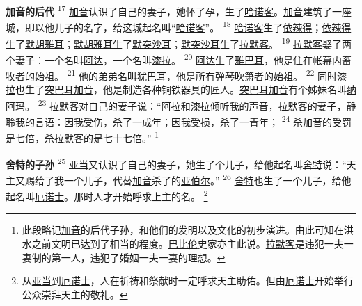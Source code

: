\textbf{加音的后代 }
\textsuperscript{17}
\uline{加音}认识了自己的妻子，她怀了孕，生了\uline{哈诺客}。\uline{加音}建筑了一座城，即以他儿子的名字，给这城起名叫“\uline{哈诺客}”。
\textsuperscript{18}
\uline{哈诺客}生了\uline{依辣得}；\uline{依辣得}生了\uline{默胡雅耳}；\uline{默胡雅耳}生了\uline{默突沙耳}；\uline{默突沙耳}生了\uline{拉默客}。
\textsuperscript{19}
\uline{拉默客}娶了两个妻子：一个名叫\uline{阿达}，一个名叫\uline{漆拉}。
\textsuperscript{20}
\uline{阿达}生了\uline{雅巴耳}，他是住在帐幕内畜牧者的始祖。
\textsuperscript{21}
他的弟弟名叫\uline{犹巴耳}，他是所有弹琴吹箫者的始祖。
\textsuperscript{22}
同时\uline{漆拉}也生了\uline{突巴耳}\uline{加音}，他是制造各种铜铁器具的匠人。\uline{突巴耳}\uline{加音}有个姊妹名叫\uline{纳阿玛}。
\textsuperscript{23}
\uline{拉默客}对自己的妻子说：“\uline{阿拉}和\uline{漆拉}倾听我的声音，\uline{拉默客}的妻子，静聆我的言语：因我受伤，杀了一成年；因我受损，杀了一青年；
\textsuperscript{24}
杀\uline{加音}的受罚是七倍，杀\uline{拉默客}的是七十七倍。”
\footnote{此段略记\uline{加音}的后代子孙，和他们的发明以及文化的初步演进。由此可知在洪水之前文明已达到了相当的程度。\uline{巴比伦}史家亦主此说。\uline{拉默客}是违犯一夫一妻制的第一人，违犯了婚姻一夫一妻的理想。}

\textbf{舍特的子孙 }
\textsuperscript{25}
\uline{亚当}又认识了自己的妻子，她生了个儿子，给他起名叫\uline{舍特}说：“天主又赐给了我一个儿子，代替\uline{加音}杀了的\uline{亚伯尔}。”
\textsuperscript{26}
\uline{舍特}也生了一个儿子，给他起名叫\uline{厄诺士}。那时人才开始呼求上主的名。
\footnote{从\uline{亚当}到\uline{厄诺士}，人在祈祷和祭献时一定呼求天主助佑。但由\uline{厄诺士}开始举行公众崇拜天主的敬礼。}

